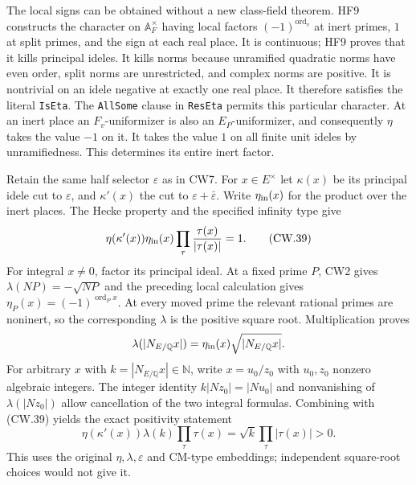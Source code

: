 The local signs can be obtained without a new class-field theorem.
HF9 constructs the character on $\mathbb A_F^\times$ having
local factors $(-1)^{\operatorname{ord}_v}$ at inert primes,
$1$ at split primes, and the sign at each real place.
It is continuous; HF9 proves that it kills principal ideles.
It kills norms because unramified quadratic norms have even
order, split norms are unrestricted, and complex norms are positive.
It is nontrivial on an idele negative at exactly one real place.
It therefore satisfies the literal \texttt{IsEta}.  The
\texttt{AllSome} clause in \texttt{ResEta} permits this particular
character.  At an inert place an $F_v$-uniformizer is also an
$E_P$-uniformizer, and consequently $\eta$ takes the value $-1$
on it.  It takes the value $1$ on all finite unit ideles by
unramifiedness.  This determines its entire inert factor.

Retain the same half selector $\varepsilon$ as in CW7.  For
$x\in E^\times$ let $\kappa(x)$ be its principal idele cut to
$\varepsilon$, and $\kappa'(x)$ the cut to
$\varepsilon+\bar\varepsilon$.
Write $\eta_{\rm in}(x)$ for the product over the inert places.
The Hecke property and the specified infinity type give
\[
 \eta(\kappa'(x))\eta_{\rm in}(x)
               \prod_\tau\frac{\tau(x)}{|\tau(x)|}=1.
                                                               \tag{CW.39}
\]
For integral $x\ne0$, factor its principal ideal.  At a fixed
prime $P$, CW2 gives $\lambda(NP)=-\sqrt{NP}$ and the preceding
local calculation gives $\eta_P(x)=(-1)^{\operatorname{ord}_P x}$.
At every moved prime the relevant rational primes are noninert,
so the corresponding $\lambda$ is the positive square root.
Multiplication proves
\[
 \lambda(|N_{E/\mathbb Q}x|)
       =\eta_{\rm in}(x)\sqrt{|N_{E/\mathbb Q}x|}.
\]
For arbitrary $x$ with $k=|N_{E/\mathbb Q}x|\in\mathbb N$, write
$x=u_0/z_0$ with $u_0,z_0$ nonzero algebraic integers.
The integer identity $k|N z_0|=|N u_0|$ and nonvanishing of
$\lambda(|Nz_0|)$ allow cancellation of the two integral formulas.
Combining with (CW.39) yields the exact positivity statement
\[
 \eta(\kappa'(x))\lambda(k)\prod_\tau\tau(x)
        =\sqrt{k}\prod_\tau|\tau(x)|>0.                \tag{CW.40}
\]
This uses the original $\eta,\lambda,\varepsilon$ and CM-type
embeddings; independent square-root choices would not give it.

